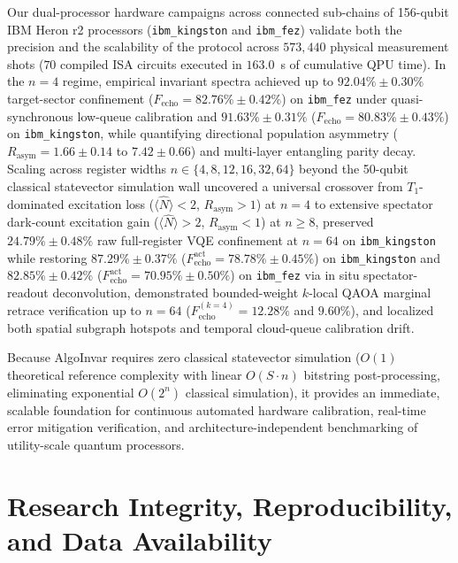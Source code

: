 \documentclass[aps,pra,reprint,superscriptaddress,floatfix,nofootinbib]{revtex4-2}
\begin{document}
Our dual-processor hardware campaigns across connected sub-chains of 156-qubit IBM Heron r2 processors (\texttt{ibm\_kingston} and \texttt{ibm\_fez}) validate both the precision and the scalability of the protocol across $573,440$ physical measurement shots ($70$ compiled ISA circuits executed in $163.0$~s of cumulative QPU time). In the $n = 4$ regime, empirical invariant spectra achieved up to $92.04\% \pm 0.30\%$ target-sector confinement ($F_{\text{echo}} = 82.76\% \pm 0.42\%$) on \texttt{ibm\_fez} under quasi-synchronous low-queue calibration and $91.63\% \pm 0.31\%$ ($F_{\text{echo}} = 80.83\% \pm 0.43\%$) on \texttt{ibm\_kingston}, while quantifying directional population asymmetry ($R_{\text{asym}} = 1.66 \pm 0.14$ to $7.42 \pm 0.66$) and multi-layer entangling parity decay. Scaling across register widths $n \in \{4, 8, 12, 16, 32, 64\}$ beyond the 50-qubit classical statevector simulation wall uncovered a universal crossover from $T_1$-dominated excitation loss ($\langle \hat{N} \rangle < 2$, $R_{\text{asym}} > 1$) at $n = 4$ to extensive spectator dark-count excitation gain ($\langle \hat{N} \rangle > 2$, $R_{\text{asym}} < 1$) at $n \ge 8$, preserved $24.79\% \pm 0.48\%$ raw full-register VQE confinement at $n = 64$ on \texttt{ibm\_kingston} while restoring $87.29\% \pm 0.37\%$ ($F_{\text{echo}}^{\text{act}} = 78.78\% \pm 0.45\%$) on \texttt{ibm\_kingston} and $82.85\% \pm 0.42\%$ ($F_{\text{echo}}^{\text{act}} = 70.95\% \pm 0.50\%$) on \texttt{ibm\_fez} via in situ spectator-readout deconvolution, demonstrated bounded-weight $k$-local QAOA marginal retrace verification up to $n = 64$ ($F_{\text{echo}}^{(k=4)} = 12.28\%$ and $9.60\%$), and localized both spatial subgraph hotspots and temporal cloud-queue calibration drift.

Because AlgoInvar requires zero classical statevector simulation ($O(1)$ theoretical reference complexity with linear $O(S \cdot n)$ bitstring post-processing, eliminating exponential $O(2^n)$ classical simulation), it provides an immediate, scalable foundation for continuous automated hardware calibration, real-time error mitigation verification, and architecture-independent benchmarking of utility-scale quantum processors.

\raggedbottom
\section{Research Integrity, Reproducibility, and Data Availability}
\label{sec:reproducibility}
\end{document}

